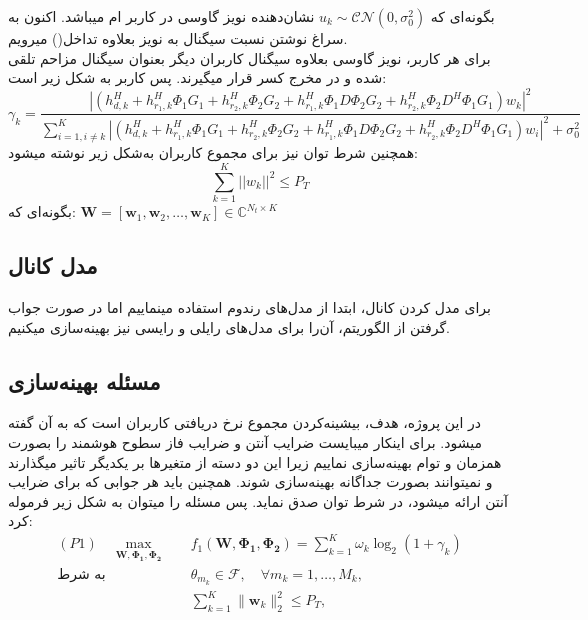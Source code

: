 بگونه‌ای که $u_k \sim \mathcal{CN}(0, \sigma_0^2)$ نشان‌دهنده نویز گاوسی در کاربر  ام میباشد.
\newpage
اکنون به سراغ نوشتن نسبت سیگنال به نویز بعلاوه تداخل() میرویم.\\
برای هر کاربر، نویز گاوسی بعلاوه سیگنال کاربران دیگر بعنوان سیگنال مزاحم تلقی شده و در مخرج کسر قرار میگیرند. پس  کاربر  به شکل زیر است:
\[
\gamma_k = \frac{{\left|\left(h_{d,k}^H + h_{r_1,k}^H \Phi_1 G_1 + h_{r_2,k}^H \Phi_2 G_2 + h_{r_1,k}^H \Phi_1 D \Phi_2 G_2 + h_{r_2,k}^H \Phi_2 D^H \Phi_1 G_1 \right)w_k\right|^2}}{{\sum_{i=1,i\neq k}^{K} \left|\left(h_{d,k}^H + h_{r_1,k}^H \Phi_1 G_1 + h_{r_2,k}^H \Phi_2 G_2 + h_{r_1,k}^H \Phi_1 D \Phi_2 G_2 + h_{r_2,k}^H \Phi_2 D^H \Phi_1 G_1 \right)w_i\right|^2 + \sigma^2_0}}
\]
همچنین شرط توان نیز برای مجموع کاربران به‌شکل زیر نوشته میشود:
\[
\sum_{k=1}^{K} ||w_k||^2 \leq P_T
\]
بگونه‌ای که:
$\mathbf{W} = [\mathbf{w}_1, \mathbf{w}_2, \ldots, \mathbf{w}_K] \in \mathbb{C}^{N_t \times K}$

\subsection{مدل کانال}
برای مدل کردن کانال، ابتدا از مدل‌های رندوم استفاده مینماییم اما در صورت جواب گرفتن از الگوریتم، آن‌را برای مدل‌های رایلی و رایسی نیز بهینه‌سازی میکنیم.

\subsection{مسئله بهینه‌سازی}
در این پروژه، هدف، بیشینه‌کردن مجموع نرخ دریافتی کاربران است که به آن  گفته میشود. برای اینکار میبایست ضرایب آنتن و ضرایب فاز سطوح هوشمند را بصورت همزمان و توام بهینه‌سازی نماییم زیرا این دو دسته از متغیرها بر یکدیگر تاثیر میگذارند و نمیتوانند بصورت جداگانه بهینه‌سازی شوند. همچنین باید هر جوابی که برای ضرایب آنتن ارائه میشود، در شرط توان صدق نماید. پس مسئله را میتوان به شکل زیر فرموله کرد:
\begin{align*}
	(P1) \quad \max_{\mathbf{W}, \boldsymbol{\Phi_1}, \boldsymbol{\Phi_2}} \quad & f_1(\mathbf{W}, \boldsymbol{\Phi_1}, \boldsymbol{\Phi_2}) = \sum_{k=1}^{K} \omega_k \log_2(1 + \gamma_k) \\
	\text{به شرط} \quad & \theta_{m_k} \in \mathcal{F}, \quad \forall m_k = 1, \ldots, M_k, \tag{4-2} \\
	& \sum_{k=1}^{K} \| \mathbf{w}_k \|_2^2 \leq P_T,
\end{align*}

\section{}
